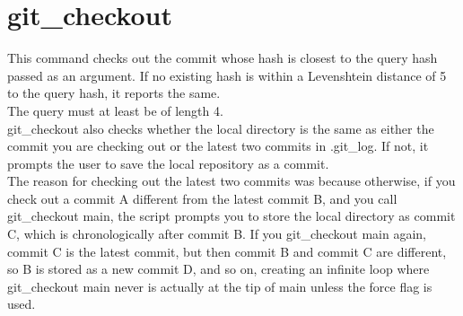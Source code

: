 \documentclass{article}
\begin{document}
    \section{git\_checkout}
    This command checks out the commit whose hash is closest to the query hash passed as an argument. If no existing hash is within a Levenshtein distance of 5 to the query hash, it reports the same.\\
    The query must at least be of length 4.\\
    git\_checkout also checks whether the local directory is the same as either the commit you are checking out or the latest two commits in .git\_log. If not, it prompts the user to save the local repository as a commit.\\
    The reason for checking out the latest two commits was because otherwise, if you check out a commit A different from the latest commit B, and you call git\_checkout main, the script prompts you to store the local directory as commit C, which is chronologically after commit B. If you git\_checkout main again, commit C is the latest commit, but then commit B and commit C are different, so B is stored as a new commit D, and so on, creating an infinite loop where git\_checkout main never is actually at the tip of main unless the force flag is used.\\
\end{document}
